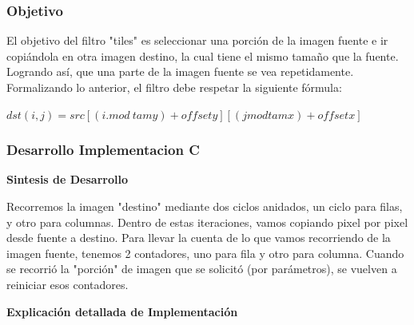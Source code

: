 \vspace*{0.3cm} \noindent
\subsubsection{Objetivo}
El objetivo del filtro "tiles" es seleccionar una porción de la imagen fuente e ir copiándola en otra imagen destino, 
la cual tiene el mismo tamaño que la fuente. \newline
Logrando así, que una parte de la imagen fuente se vea repetidamente.
Formalizando lo anterior, el filtro debe respetar la siguiente fórmula:\newline

$dst(i,j) = src[(i.mod\ tamy)+offsety][(j mod tamx)+offsetx]$


\vspace*{0.3cm} \noindent

\subsubsection{Desarrollo Implementacion C}

\begin{center}
\textbf{Sintesis de Desarrollo} 
\end{center}

Recorremos la imagen "destino" mediante dos ciclos anidados, un ciclo para filas, y otro para columnas.
Dentro de estas iteraciones, vamos copiando pixel por pixel desde fuente a destino.
Para llevar la cuenta de lo que vamos recorriendo de la imagen fuente, tenemos 2 contadores, uno para fila 
y otro para columna. Cuando se recorrió la "porción" de imagen que se solicitó (por parámetros), 
se vuelven a reiniciar esos contadores.\newline


\begin{center}
\textbf{Explicación detallada de Implementación}

\end{center}




